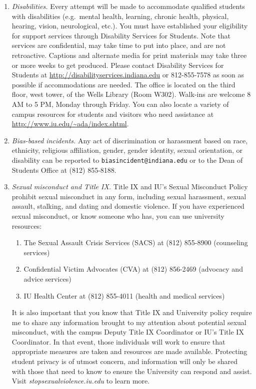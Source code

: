 \documentclass[11pt,article,oneside]{memoir} %
\begin{document}
\begin{enumerate}
\item \emph{Disabilities.} Every attempt will be made to accommodate qualified
students with disabilities (e.g.~mental health, learning, chronic health,
physical, hearing, vision, neurological, etc.). You must have established your
eligibility for support services through Disability Services for Students. Note
that services are confidential, may take time to put into place, and are not
retroactive.  Captions and alternate media for print materials may take three
or more weeks to get produced. Please contact Disability Services for Students
at \url{http://disabilityservices.indiana.edu} or 812-855-7578 as soon as
possible if accommodations are needed. The office is located on the third
floor, west tower, of the Wells Library (Room W302). Walk-ins are welcome 8 AM
to 5 PM, Monday through Friday. You can also locate a variety of campus
resources for students and visitors who need assistance at
\url{http://www.iu.edu/~ada/index.shtml}. 

\item \emph{Bias-based incidents.} Any act of discrimination or harassment based on 
race, ethnicity, religious affiliation, gender, gender identity, sexual orientation, or
disability can be reported to \texttt{biasincident@indiana.edu} or to the Dean of Students Office at (812) 855-8188. 

\item \emph{Sexual misconduct and Title IX.} 
Title IX and IU's Sexual Misconduct Policy prohibit sexual misconduct in any
form, including sexual harassment, sexual assault, stalking, and dating and
domestic violence.  If you have experienced sexual misconduct, or know someone
who has, you can use university resources:  

\begin{enumerate}
    
\item The Sexual Assault Crisis Services (SACS) at (812) 855-8900 (counseling services)
\item Confidential Victim Advocates (CVA) at (812) 856-2469 (advocacy and advice services)
\item IU Health Center at (812) 855-4011 (health and medical services)

\end{enumerate}

It is also important that you know that Title IX and University policy require me to share any information brought to my attention about potential sexual misconduct, with the campus Deputy Title IX Coordinator or IU's Title IX Coordinator. 
In that event, those individuals will work to ensure that appropriate measures are taken and resources are made available. 
Protecting student privacy is of utmost concern, and information will only be shared with those that need to know to ensure the University can respond and assist. 
Visit \emph{stopsexualviolence.iu.edu} to learn more. 


\end{enumerate}
\end{document}
